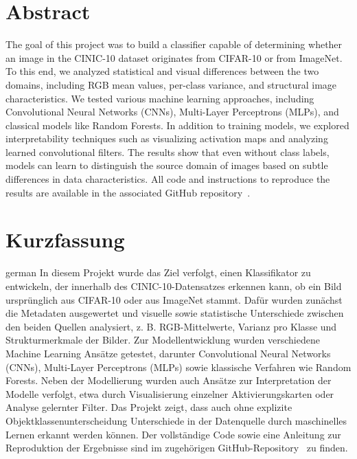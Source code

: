 \thispagestyle{plain}

\section*{Abstract}
The goal of this project was to build a classifier capable of determining whether an image in the CINIC-10 dataset originates from CIFAR-10 or from ImageNet. 
To this end, we analyzed statistical and visual differences between the two domains, including RGB mean values, per-class variance, and structural image characteristics.
We tested various machine learning approaches, including Convolutional Neural Networks (CNNs), Multi-Layer Perceptrons (MLPs), and classical models like Random Forests. 
In addition to training models, we explored interpretability techniques such as visualizing activation maps and analyzing learned convolutional filters. 
The results show that even without class labels, models can learn to distinguish the source domain of images based on subtle differences in data characteristics.
All code and instructions to reproduce the results are available in the associated GitHub repository~\cite{cinic10-source-classifier}.

\section*{Kurzfassung}
\begin{foreignlanguage}{german}
In diesem Projekt wurde das Ziel verfolgt, einen Klassifikator zu entwickeln, der innerhalb des CINIC-10-Datensatzes erkennen kann, ob ein Bild ursprünglich aus CIFAR-10 oder aus ImageNet 
stammt. Dafür wurden zunächst die Metadaten ausgewertet und visuelle sowie statistische Unterschiede zwischen den beiden Quellen analysiert, z. B. RGB-Mittelwerte, 
Varianz pro Klasse und Strukturmerkmale der Bilder.
Zur Modellentwicklung wurden verschiedene Machine Learning Ansätze getestet, darunter Convolutional Neural Networks (CNNs), Multi-Layer Perceptrons (MLPs) sowie klassische Verfahren wie 
Random Forests.
Neben der Modellierung wurden auch Ansätze zur Interpretation der Modelle verfolgt, etwa durch Visualisierung einzelner Aktivierungskarten oder Analyse gelernter Filter. 
Das Projekt zeigt, dass auch ohne explizite Objektklassenunterscheidung Unterschiede in der Datenquelle durch maschinelles Lernen erkannt werden können.
Der vollständige Code sowie eine Anleitung zur Reproduktion der Ergebnisse sind im zugehörigen GitHub-Repository~\cite{cinic10-source-classifier} zu finden.
\end{foreignlanguage}
